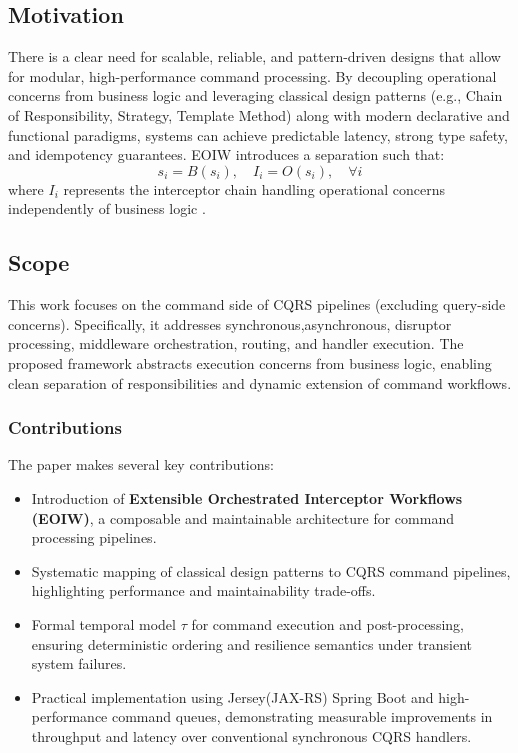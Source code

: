 \subsection{Motivation}
There is a clear need for scalable, reliable, and pattern-driven designs that allow for modular, high-performance command processing. By decoupling operational concerns from business logic and leveraging classical design patterns (e.g., Chain of Responsibility, Strategy, Template Method)  along with modern declarative and functional paradigms, systems can achieve predictable latency, strong type safety, and idempotency guarantees. EOIW introduces a separation such that:
\[
s_i = B(s_i), \quad I_i = O(s_i), \quad \forall i
\]
where $I_i$ represents the interceptor chain handling operational concerns independently of business logic .

\subsection{Scope}
This work focuses on the command side of CQRS pipelines (excluding query-side concerns). Specifically, it addresses synchronous,asynchronous, disruptor processing, middleware orchestration, routing, and handler execution. The proposed framework abstracts execution concerns from business logic, enabling clean separation of responsibilities and dynamic extension of command workflows.

\subsubsection{Contributions}
The paper makes several key contributions:
\begin{itemize}
    \item Introduction of \textbf{Extensible Orchestrated Interceptor Workflows (EOIW)}, a composable and maintainable architecture for command processing pipelines.
    \item Systematic mapping of classical design patterns to CQRS command pipelines, highlighting performance and maintainability trade-offs.
    \item Formal temporal model $\tau$ for command execution and post-processing, ensuring deterministic ordering and resilience semantics under transient system failures.
    \item Practical implementation using Jersey(JAX-RS) Spring Boot and high-performance command queues, demonstrating measurable improvements in throughput and latency over conventional synchronous CQRS handlers.
\end{itemize}